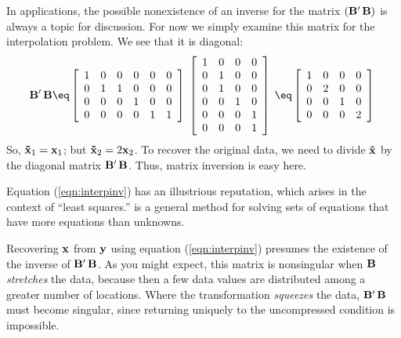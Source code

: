 In applications,
the possible nonexistence of an inverse for the matrix $( {\bf B' \, B} )$
is always a topic for discussion.
For now we simply examine this matrix for the interpolation problem.
We see that it is diagonal:
\begin{equation}
\bold B' \, \bold B
\eq
 \left[ 
  \begin{array}{ccccccc}
  1 & 0 & 0 & 0 & 0 & 0\\
  0 & 1 & 1 & 0 & 0 & 0\\
  0 & 0 & 0 & 1 & 0 & 0\\
  0 & 0 & 0 & 0 & 1 & 1
  \end{array}
 \right] \;
 \left[ 
  \begin{array}{cccc}
  1 & 0 & 0 & 0 \\
  0 & 1 & 0 & 0 \\
  0 & 1 & 0 & 0 \\
  0 & 0 & 1 & 0 \\
  0 & 0 & 0 & 1 \\
  0 & 0 & 0 & 1
  \end{array}
 \right] \;
 \eq
 \left[ 
  \begin{array}{cccc}
  1 & 0 & 0 & 0 \\
  0 & 2 & 0 & 0 \\
  0 & 0 & 1 & 0 \\
  0 & 0 & 0 & 2
  \end{array}
 \right] \;
\end{equation}
So, ${\bf \tilde x}_1 =   \bold x_1$; but
    ${\bf \tilde x}_2 = 2 \bold x_2$.
To recover the original data,
we need to divide ${\bf \tilde x}$ by the diagonal matrix $\bold B'\,\bold B$.
Thus, matrix inversion is easy here.

\par
Equation
(\ref{eqn:interpinv})
has an illustrious reputation, which
arises in the context of ``least squares.''
is a general method for solving sets of equations
that have more equations than unknowns.

\par
Recovering $\bold x$ from $\bold y$ using equation
(\ref{eqn:interpinv})
presumes the existence of the inverse of
$\bold B'\,\bold B$.
As you might expect, this matrix is nonsingular when ${\bf B}$
{\em  stretches} the data,
because then a few data values are distributed
among a greater number of locations.
Where the transformation {\em  squeezes} the data,
$\bold B'\,\bold B$
must become singular,
since returning
uniquely to the uncompressed condition is impossible.


